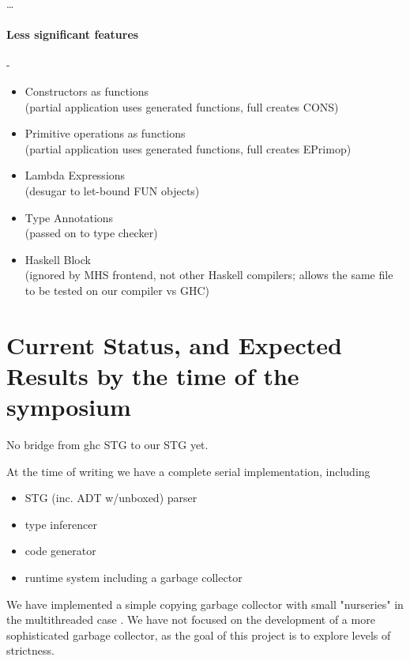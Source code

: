 \documentclass{llncs}
\begin{document}
{\color{red}\dots}



\paragraph{Less significant features} -\\

\begin{itemize}
\item Constructors as functions \\
  (partial application uses generated functions, full creates CONS)

\item Primitive operations as functions \\
  (partial application uses generated functions, full creates EPrimop)

\item Lambda Expressions \\
  (desugar to let-bound FUN objects)

\item Type Annotations \\
  (passed on to type checker)

\item Haskell Block \\
  (ignored by MHS frontend, not other Haskell compilers;
  allows the same file to be tested on our compiler vs GHC)
\end{itemize}


\section{Current Status, and Expected Results by the time of the symposium}

No bridge from ghc STG to our STG yet.

At the time of writing we have a complete serial implementation, including
\begin{itemize}
\item STG (inc. ADT w/unboxed) parser
\item type inferencer
\item code generator
\item runtime system including a garbage collector
\end{itemize}

We have implemented a simple copying garbage collector \cite{Cheney:1970}
with small "nurseries" in the multithreaded case \cite{Marlow:2008}. We have not
focused on the development of a more sophisticated garbage collector, as the goal
of this project is to explore levels of strictness.
\end{document}
